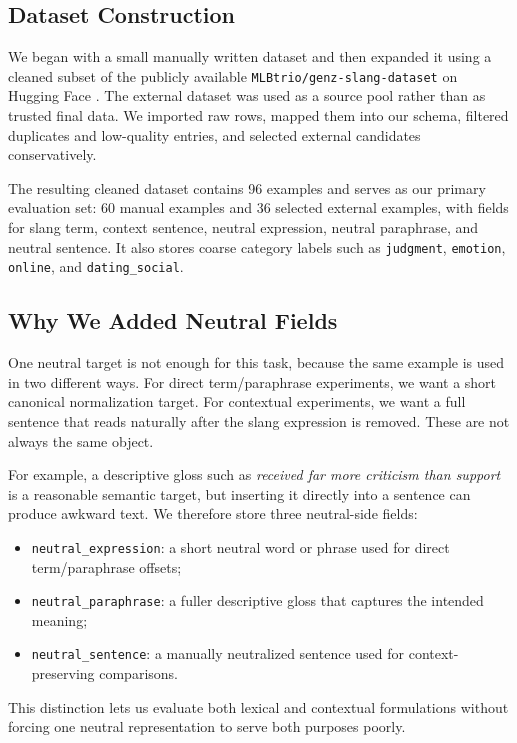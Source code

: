\documentclass{article}
\begin{document}
\subsection{Dataset Construction}
We began with a small manually written dataset and then expanded it using a cleaned subset of the publicly available \texttt{MLBtrio/genz-slang-dataset} on Hugging Face \citep{mlbtrio2026dataset}.
The external dataset was used as a source pool rather than as trusted final data.
We imported raw rows, mapped them into our schema, filtered duplicates and low-quality entries, and selected external candidates conservatively.

The resulting cleaned dataset contains 96 examples and serves as our primary evaluation set: 60 manual examples and 36 selected external examples, with fields for slang term, context sentence, neutral expression, neutral paraphrase, and neutral sentence.
It also stores coarse category labels such as \texttt{judgment}, \texttt{emotion}, \texttt{online}, and \texttt{dating\_social}.

\subsection{Why We Added Neutral Fields}
One neutral target is not enough for this task, because the same example is used in two different ways.
For direct term/paraphrase experiments, we want a short canonical normalization target.
For contextual experiments, we want a full sentence that reads naturally after the slang expression is removed.
These are not always the same object.

For example, a descriptive gloss such as \emph{received far more criticism than support} is a reasonable semantic target, but inserting it directly into a sentence can produce awkward text.
We therefore store three neutral-side fields:
\begin{itemize}
\item \texttt{neutral\_expression}: a short neutral word or phrase used for direct term/paraphrase offsets;
\item \texttt{neutral\_paraphrase}: a fuller descriptive gloss that captures the intended meaning;
\item \texttt{neutral\_sentence}: a manually neutralized sentence used for context-preserving comparisons.
\end{itemize}

This distinction lets us evaluate both lexical and contextual formulations without forcing one neutral representation to serve both purposes poorly.
\end{document}
